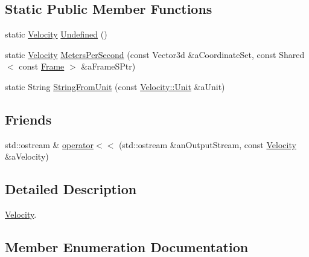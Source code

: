 \subsection*{Static Public Member Functions}
\begin{DoxyCompactItemize}
\item 
static \hyperlink{classlibrary_1_1physics_1_1coord_1_1_velocity}{Velocity} \hyperlink{classlibrary_1_1physics_1_1coord_1_1_velocity_ae6480807520330e282b712805aa4fea5}{Undefined} ()
\item 
static \hyperlink{classlibrary_1_1physics_1_1coord_1_1_velocity}{Velocity} \hyperlink{classlibrary_1_1physics_1_1coord_1_1_velocity_aca486d66f18e8fab83d45c3b52bb9324}{Meters\+Per\+Second} (const Vector3d \&a\+Coordinate\+Set, const Shared$<$ const \hyperlink{classlibrary_1_1physics_1_1coord_1_1_frame}{Frame} $>$ \&a\+Frame\+S\+Ptr)
\item 
static String \hyperlink{classlibrary_1_1physics_1_1coord_1_1_velocity_ad9a3d2d5759384f513f7790534e620a3}{String\+From\+Unit} (const \hyperlink{classlibrary_1_1physics_1_1coord_1_1_velocity_a8bbc811932c454dbe0ab8b56f1b2c0b3}{Velocity\+::\+Unit} \&a\+Unit)
\end{DoxyCompactItemize}
\subsection*{Friends}
\begin{DoxyCompactItemize}
\item 
std\+::ostream \& \hyperlink{classlibrary_1_1physics_1_1coord_1_1_velocity_ab3987a176df736aa7fa50aa763ed068b}{operator$<$$<$} (std\+::ostream \&an\+Output\+Stream, const \hyperlink{classlibrary_1_1physics_1_1coord_1_1_velocity}{Velocity} \&a\+Velocity)
\end{DoxyCompactItemize}


\subsection{Detailed Description}
\hyperlink{classlibrary_1_1physics_1_1coord_1_1_velocity}{Velocity}. 

\subsection{Member Enumeration Documentation}
\mbox{\label{classlibrary_1_1physics_1_1coord_1_1_velocity_a8bbc811932c454dbe0ab8b56f1b2c0b3}} 

